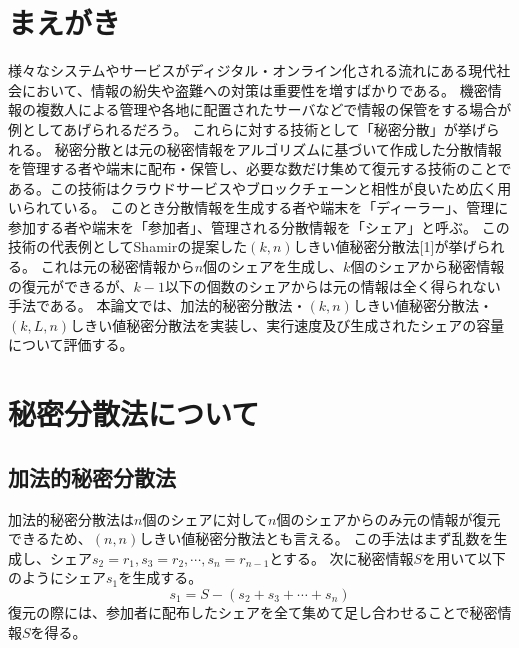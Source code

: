 \documentclass[twocolumn,a4paper]{jsarticle}
\begin{document}

	\fontsize{9pt}{5mm}\selectfont
	\section{まえがき}
	様々なシステムやサービスがディジタル・オンライン化される流れにある現代社会において、情報の紛失や盗難への対策は重要性を増すばかりである。
	機密情報の複数人による管理や各地に配置されたサーバなどで情報の保管をする場合が例としてあげられるだろう。
	これらに対する技術として「秘密分散」が挙げられる。
	秘密分散とは元の秘密情報をアルゴリズムに基づいて作成した分散情報を管理する者や端末に配布・保管し、必要な数だけ集めて復元する技術のことである。この技術はクラウドサービスやブロックチェーンと相性が良いため広く用いられている。
	このとき分散情報を生成する者や端末を「ディーラー」、管理に参加する者や端末を「参加者」、管理される分散情報を「シェア」と呼ぶ。
	この技術の代表例としてShamirの提案した$(k,n)$しきい値秘密分散法[1]が挙げられる。
	これは元の秘密情報から$n$個のシェアを生成し、$k$個のシェアから秘密情報の復元ができるが、$k-1$以下の個数のシェアからは元の情報は全く得られない手法である。
	本論文では、加法的秘密分散法・$(k,n)$しきい値秘密分散法・$(k,L,n)しきい値秘密分散法$を実装し、実行速度及び生成されたシェアの容量について評価する。

	\section{秘密分散法について}
	\subsection{加法的秘密分散法}
	加法的秘密分散法は$n$個のシェアに対して$n$個のシェアからのみ元の情報が復元できるため、$(n,n)$しきい値秘密分散法とも言える。
	この手法はまず乱数を生成し、シェア$s_{2}=r_{1},s_{3}=r_{2},{\cdots},s_{n}=r_{n-1}$とする。
	次に秘密情報$S$を用いて以下のようにシェア$s_{1}$を生成する。
	\begin{equation}
		s_{1}=S-(s_{2}+s_{3}+{\cdots}+s_{n})
	\end{equation}
	復元の際には、参加者に配布したシェアを全て集めて足し合わせることで秘密情報$S$を得る。
\end{document}
